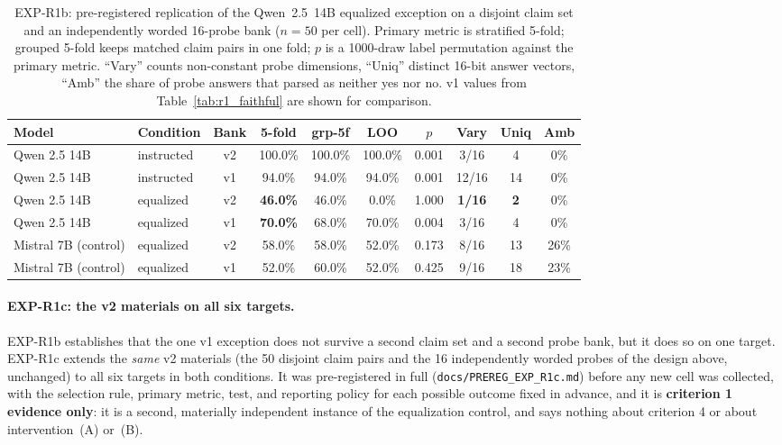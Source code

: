 \begin{table}[h]
\centering
\setlength{\tabcolsep}{4pt}
\small
\caption{EXP-R1b: pre-registered replication of the Qwen~2.5~14B equalized exception on a disjoint claim set and an independently worded 16-probe bank ($n=50$ per cell). Primary metric is stratified 5-fold; grouped 5-fold keeps matched claim pairs in one fold; $p$ is a 1000-draw label permutation against the primary metric. ``Vary'' counts non-constant probe dimensions, ``Uniq'' distinct 16-bit answer vectors, ``Amb'' the share of probe answers that parsed as neither yes nor no. v1 values from Table~\ref{tab:r1_faithful} are shown for comparison.}
\label{tab:r1_variants}
\begin{tabular}{llcccccccc}
\toprule
\textbf{Model} & \textbf{Condition} & \textbf{Bank} & 5-fold & grp-5f & LOO & \textbf{$p$} & \textbf{Vary} & \textbf{Uniq} & \textbf{Amb} \\
\midrule
Qwen 2.5 14B & instructed & v2 & 100.0\% & 100.0\% & 100.0\% & 0.001 & 3/16 & 4 & \phantom{0}0\% \\
Qwen 2.5 14B & instructed & v1 & \phantom{0}94.0\% & \phantom{0}94.0\% & \phantom{0}94.0\% & 0.001 & 12/16 & 14 & \phantom{0}0\% \\
\midrule
Qwen 2.5 14B & equalized  & v2 & \textbf{46.0\%} & 46.0\% & \phantom{0}0.0\% & 1.000 & \textbf{1/16} & \textbf{2} & \phantom{0}0\% \\
Qwen 2.5 14B & equalized  & v1 & \textbf{70.0\%} & 68.0\% & 70.0\% & 0.004 & 3/16 & 4 & \phantom{0}0\% \\
\midrule
Mistral 7B (control) & equalized & v2 & 58.0\% & 58.0\% & 52.0\% & 0.173 & 8/16 & 13 & 26\% \\
Mistral 7B (control) & equalized & v1 & 52.0\% & 60.0\% & 52.0\% & 0.425 & 9/16 & 18 & 23\% \\
\bottomrule
\end{tabular}
\end{table}

\paragraph{EXP-R1c: the v2 materials on all six targets.} EXP-R1b establishes that the one v1 exception does not survive a second claim set and a second probe bank, but it does so on one target. EXP-R1c extends the \emph{same} v2 materials (the 50 disjoint claim pairs and the 16 independently worded probes of the design above, unchanged) to all six targets in both conditions. It was pre-registered in full (\texttt{docs/PREREG\_EXP\_R1c.md}) before any new cell was collected, with the selection rule, primary metric, test, and reporting policy for each possible outcome fixed in advance, and it is \textbf{criterion 1 evidence only}: it is a second, materially independent instance of the equalization control, and says nothing about criterion 4 or about intervention~(A) or~(B).

